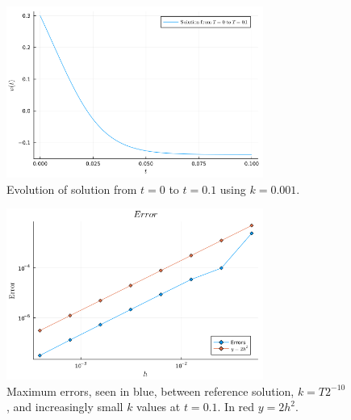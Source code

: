 \documentclass[12pt]{report}
\begin{document}
\begin{solution}
\begin{figure}
    \centering
    \includegraphics[width=0.75\textwidth,height=\textwidth,keepaspectratio]{images/1-sol.png}
    \caption{Evolution of solution from $t=0$ to $t=0.1$ using $k=0.001$.}
    \label{q1-sol}    
\end{figure} 

\begin{figure}[H]
    \centering
    \includegraphics[width=0.75\textwidth,height=\textwidth,keepaspectratio]{images/1-err.png}
    \caption{Maximum errors, seen in blue, between reference solution, $k=T2^{-10}$, and increasingly small $k$ values at $t=0.1$. In red $y=2h^2$.}
    \label{q1-err}
\end{figure}


\end{solution}
\end{document}
